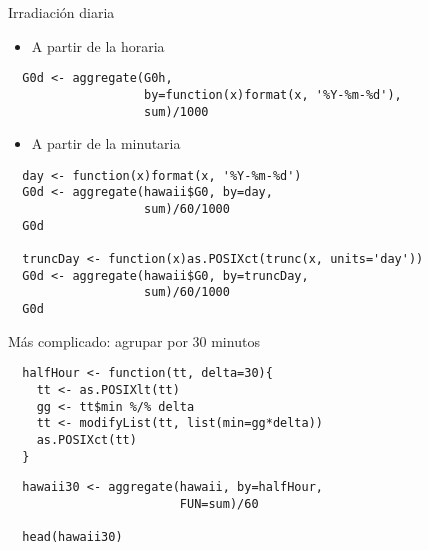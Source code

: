 \documentclass[xcolor={usenames,svgnames,dvipsnames}]{beamer}
\begin{document}
\begin{frame}[fragile,label=sec-4-7]{Irradiación diaria}
 \begin{itemize}
\item A partir de la horaria
\end{itemize}
\lstset{language=R,label= ,caption= ,numbers=none}
\begin{lstlisting}
  G0d <- aggregate(G0h,
                   by=function(x)format(x, '%Y-%m-%d'),
                   sum)/1000
\end{lstlisting}
\begin{itemize}
\item A partir de la minutaria
\end{itemize}
\lstset{language=R,label= ,caption= ,numbers=none}
\begin{lstlisting}
  day <- function(x)format(x, '%Y-%m-%d')
  G0d <- aggregate(hawaii$G0, by=day,
                   sum)/60/1000
  G0d
  
  truncDay <- function(x)as.POSIXct(trunc(x, units='day'))
  G0d <- aggregate(hawaii$G0, by=truncDay,
                   sum)/60/1000
  G0d
\end{lstlisting}
\end{frame}


\begin{frame}[fragile,label=sec-4-8]{Más complicado: agrupar por 30 minutos}
 \lstset{language=R,label= ,caption= ,numbers=none}
\begin{lstlisting}
  halfHour <- function(tt, delta=30){
    tt <- as.POSIXlt(tt)
    gg <- tt$min %/% delta
    tt <- modifyList(tt, list(min=gg*delta))
    as.POSIXct(tt)
  }
\end{lstlisting}

\lstset{language=R,label= ,caption= ,numbers=none}
\begin{lstlisting}
  hawaii30 <- aggregate(hawaii, by=halfHour,
                        FUN=sum)/60
  
  head(hawaii30)
\end{lstlisting}
\end{frame}
\end{document}
